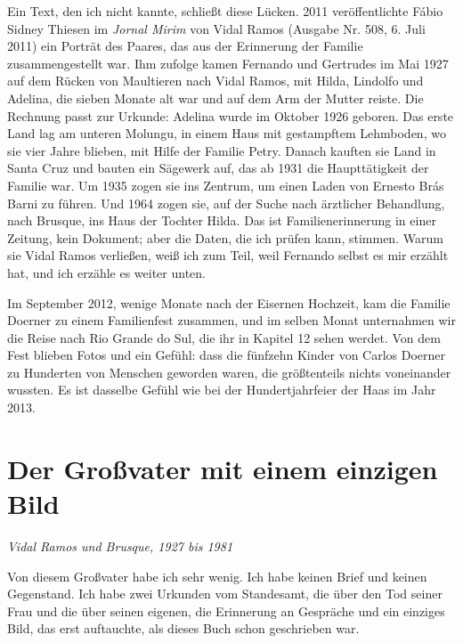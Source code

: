 \documentclass[
  ngerman,
  11pt,
  openany]{book}
\begin{document}
Ein Text, den ich nicht kannte, schließt diese Lücken. 2011
veröffentlichte Fábio Sidney Thiesen im \emph{Jornal Mirim} von Vidal
Ramos (Ausgabe Nr. 508, 6. Juli 2011) ein Porträt des Paares, das aus
der Erinnerung der Familie zusammengestellt war. Ihm zufolge kamen
Fernando und Gertrudes im Mai 1927 auf dem Rücken von Maultieren nach
Vidal Ramos, mit Hilda, Lindolfo und Adelina, die sieben Monate alt war
und auf dem Arm der Mutter reiste. Die Rechnung passt zur Urkunde:
Adelina wurde im Oktober 1926 geboren. Das erste Land lag am unteren
Molungu, in einem Haus mit gestampftem Lehmboden, wo sie vier Jahre
blieben, mit Hilfe der Familie Petry. Danach kauften sie Land in Santa
Cruz und bauten ein Sägewerk auf, das ab 1931 die Haupttätigkeit der
Familie war. Um 1935 zogen sie ins Zentrum, um einen Laden von Ernesto
Brás Barni zu führen. Und 1964 zogen sie, auf der Suche nach ärztlicher
Behandlung, nach Brusque, ins Haus der Tochter Hilda. Das ist
Familienerinnerung in einer Zeitung, kein Dokument; aber die Daten, die
ich prüfen kann, stimmen. Warum sie Vidal Ramos verließen, weiß ich zum
Teil, weil Fernando selbst es mir erzählt hat, und ich erzähle es weiter
unten.

Im September 2012, wenige Monate nach der Eisernen Hochzeit, kam die
Familie Doerner zu einem Familienfest zusammen, und im selben Monat
unternahmen wir die Reise nach Rio Grande do Sul, die ihr in Kapitel 12
sehen werdet. Von dem Fest blieben Fotos und ein Gefühl: dass die
fünfzehn Kinder von Carlos Doerner zu Hunderten von Menschen geworden
waren, die größtenteils nichts voneinander wussten. Es ist dasselbe
Gefühl wie bei der Hundertjahrfeier der Haas im Jahr 2013.

\section{Der Großvater mit einem einzigen
Bild}\label{der-grouxdfvater-mit-einem-einzigen-bild}

\emph{Vidal Ramos und Brusque, 1927 bis 1981}

Von diesem Großvater habe ich sehr wenig. Ich habe keinen Brief und
keinen Gegenstand. Ich habe zwei Urkunden vom Standesamt, die über den
Tod seiner Frau und die über seinen eigenen, die Erinnerung an Gespräche
und ein einziges Bild, das erst auftauchte, als dieses Buch schon
geschrieben war.
\end{document}
